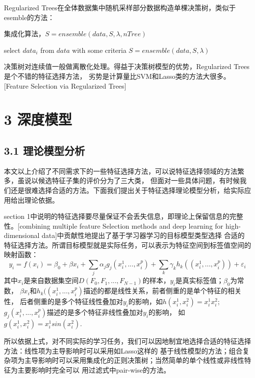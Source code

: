 \documentclass[a4paper,UTF8]{article}
\begin{document}
Regularized Trees在全体数据集中随机采样部分数据构造单棵决策树，类似于esemble的方法：
\begin{algorithm}
  \caption{集成化算法，$S=ensemble(data,S,\lambda,nTree)$}
  \begin{algorithmic}[1]

      \STATE select $data_{i}$ from $data$ with some criteria
      \STATE $S=ensemble(data,S,\lambda)$
    \ENDFOR
  \end{algorithmic}


\end{algorithm}

决策树对连续值一般做离散化处理。得益于决策树模型的优势，Regularized Trees是个不错的特征选择方法，
劣势是计算量比SVM和Lasso类的方法大很多。[Feature Selection via Regularized Trees]


\section*{3 深度模型}


\subsection*{3.1 理论模型分析}

本文以上介绍了不同需求下的一些特征选择方法，可以说特征选择领域的方法繁多，虽说以候选特征子集的评价分为了三大类，
但面对一些具体问题，有时候我们还是很难选择合适的方法。下面我们提出关于特征选择理论模型分析，给实际应用给出理论依据。

section 1中说明的特征选择要尽量保证不会丢失信息，即理论上保留信息的完整性。[combining multiple feature Selection
methods and deep learning for high-dimensional data]中贡献性地提出了基于学习器学习的目标模型类型选择
合适的特征选择方法。所谓目标模型就是实际任务，可以表示为特征空间到标签值空间的映射函数：
$$y_{i}=f(x_{i})=\beta_{0}+\beta x_{i}+\sum_{j}{\alpha_{j} g_{j}(x_{i}^{1},...,x_{i}^{p})}
+\sum_{k}{\gamma_{k} h_{k}((x_{i}^{1},...,x_{i}^{p}))}+\varepsilon_{i}$$
其中$x_{i}$是来自数据集空间$D(F_{0}, F_{1},..., F_{N-1})$的样本，$y_{i}$是真实标签值；$\beta_{0}$为常数，
$\beta x_{i}$和$h_{k}((x_{i}^{1},...,x_{i}^{p})$描述的都是线性关系，前者侧重的是单个特征的相关性，
后者侧重的是多个特征线性叠加对$y_{i}$的影响，如$h(x_{i}^{1},x_{i}^{2})=x_{i}^{1}x_{i}^{2}$;
$g_{j}(x_{i}^{1},...,x_{i}^{p})$描述的是多个特征非线性叠加对$y_{i}$的影响，
如$g(x_{i}^{1},x_{i}^{2})=x_{i}^{1}sin(x_{i}^{2})$.

所以依据上式，对不同实际的学习任务，我们可以因地制宜地选择合适的特征选择方法：线性项为主导影响时可以采用如Lasso这样的
基于线性模型的方法；组合复杂项为主导影响时可以采用集成化的正则决策树；当然简单的单个线性或非线性特征为主要影响时完全可以
用过滤式中pair-wise的方法。
\end{document}
